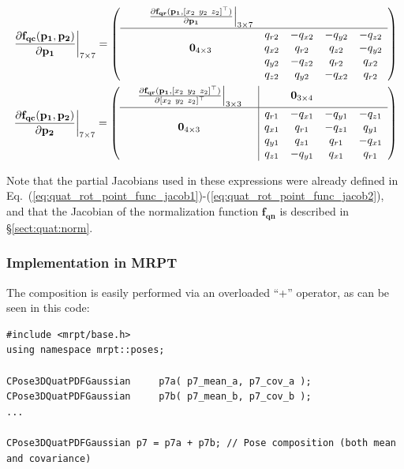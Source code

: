 \documentclass[a4paper,10pt]{report}
\begin{document}
\begin{eqnarray}
\left. 
\frac{\partial \mathbf{f_{qc}}(\mathbf{p_1},\mathbf{p_2}) }{\partial \mathbf{p_1}} 
\right|_{7 \times 7} 
= 
\left(
  \begin{array}{ccccccc}
     & & \left. \frac{\partial \mathbf{f_{qr}} (\mathbf{p_1}, [ x_2 ~ y_2 ~ z_2]^\top ) }{\partial \mathbf{p_1}} \right|_{3\times 7}   & &  \\ \hline
    &  &  			& q_{r2} &-q_{x2} &-q_{y2} &-q_{z2}  \\
    & & \mathbf{0}_{4\times 3}  	& q_{x2} & q_{r2} & q_{z2} &-q_{y2}  \\
    & &  			& q_{y2} &-q_{z2} & q_{r2} & q_{x2}  \\
    & &  			& q_{z2} & q_{y2} &-q_{x2} & q_{r2}   
  \end{array}
\right) 
\\
\left. 
\frac{\partial \mathbf{f_{qc}}(\mathbf{p_1},\mathbf{p_2}) }{\partial \mathbf{p_2}} 
\right|_{7 \times 7} 
= 
\left(
  \begin{array}{ccc|cccc}
     & \left. 
	\frac{\partial \mathbf{f_{qr}} (\mathbf{p_1}, [ x_2 ~ y_2 ~ z_2]^\top ) }{\partial [ x_2 ~ y_2 ~ z_2]^\top} \right|_{3\times 3} 
      &  & & \mathbf{0}_{3 \times 4}  \\ \hline
   & & 				& q_{r1} &-q_{x1} &-q_{y1} &-q_{z1}  \\
   & \mathbf{0}_{4\times 3} &	& q_{x1} & q_{r1} &-q_{z1} & q_{y1}  \\
   & & 				& q_{y1} & q_{z1} & q_{r1} &-q_{x1}  \\
   & & 				& q_{z1} &-q_{y1} & q_{x1} & q_{r1}   
  \end{array}
\right)
\end{eqnarray}


Note that the partial Jacobians used in these expressions were already defined 
in Eq.~(\ref{eq:quat_rot_point_func_jacob1})-(\ref{eq:quat_rot_point_func_jacob2}),
and that the Jacobian of the normalization function $\mathbf{f_{qn}}$ is described
in \S \ref{sect:quat:norm}.



\subsubsection{Implementation in MRPT}

The composition is easily performed via an overloaded ``+'' operator, as can be seen in this code:

\begin{lstlisting}
#include <mrpt/base.h> 
using namespace mrpt::poses; 

CPose3DQuatPDFGaussian     p7a( p7_mean_a, p7_cov_a ); 
CPose3DQuatPDFGaussian     p7b( p7_mean_b, p7_cov_b ); 
...

CPose3DQuatPDFGaussian p7 = p7a + p7b; // Pose composition (both mean and covariance)
\end{lstlisting}
\end{document}
